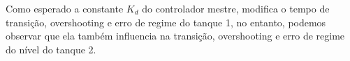 Como esperado a constante $K_d$ do controlador mestre, modifica o tempo de transição, overshooting e erro de regime do tanque 1,
no entanto, podemos observar que ela também influencia na transição, overshooting e erro de regime do nível do tanque 2.